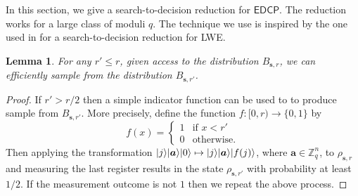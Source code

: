 \documentclass[11pt]{article}
\theoremstyle{plain}
\newtheorem{lemma}[theorem]{Lemma}
\theoremstyle{definition}
\DeclarePairedDelimiter{\ldbrac}{\lvert}{\rangle}
\def\Z{\ensuremath{\mathbb{Z}}}
\def\edcp{\ensuremath{\mathsf{EDCP}}}
\begin{document}
In this section, we give a search-to-decision reduction for $\edcp$. The reduction works for a large class of moduli $q$. The technique we use is inspired by the one used in \cite{micciancio2012trapdoors} for a search-to-decision reduction for LWE.
\begin{lemma}
    \label{lem:small-r}
    For any $r' \le r$, given access to the distribution $B_{\bm{s}, r}$, we can efficiently sample from the distribution $B_{\bm{s}, r'}$. 
\end{lemma}
\begin{proof}
    If $r' > r / 2$ then a simple indicator function can be used to to produce sample from $B_{\bm{s}, r'}$. More precisely, define the function $f: [0, r) \rightarrow \{ 0, 1 \}$ by
    \[ f(x) = 
    \begin{cases}
        1 & \text{if } x < r' \\
        0 & \text{otherwise}.
    \end{cases} \]
    Then applying the transformation $\ldbrac{j}\ldbrac{\bm{a}}\ldbrac{0} \mapsto \ldbrac{j}\ldbrac{\bm{a}}\ldbrac{f(j)}$, where $\bm{a} \in \Z_q^n$, to $\rho_{\bm{s}, r}$ and measuring the last register results in the state $\rho_{\bm{s}, r'}$ with probability at least $1 / 2$. If the measurement outcome is not $1$ then we repeat the above process.


\end{proof}
\end{document}
